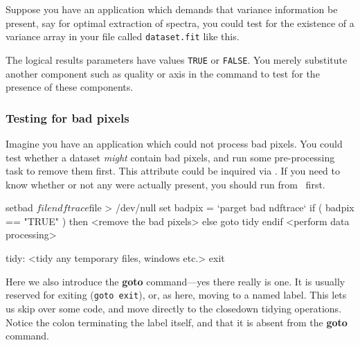 \documentclass[twoside,11pt,nolof]{starlink}
\providecommand{\KAPPAref}{\xref{{\footnotesize KAPPA}}{sun95}{}}
\begin{document}
Suppose you have an application which demands that variance information
be present, say for optimal extraction of spectra, you could test for
the existence of a variance array in your  file called \texttt{dataset.fit} like this.

\begin{small}
\end{small}
The logical results parameters have values \texttt{TRUE} or \texttt{FALSE}\@.
You merely substitute another component such as quality or axis in the
 command to test for the presence of
these components.

\subsubsection{Testing for bad pixels
\label{sc4_se_dataset_badpix}}

Imagine you have an application which could not process bad pixels.
You could test whether a dataset \emph{might\/} contain bad pixels, and
run some pre-processing task to remove them first.  This attribute
could be inquired via .  If you
need to know whether or not any were actually present, you should run
 from \KAPPAref\ first.

\begin{small}
\begin{terminalv}
     setbad $file
     ndftrace $file > /dev/null
     set badpix = `parget bad ndftrace`
     if ( badpix == "TRUE" ) then
        <remove the bad pixels>
     else
        goto tidy
     endif
     <perform data processing>

     tidy:
     <tidy any temporary files, windows etc.>
     exit
\end{terminalv}
\end{small}
Here we also introduce the \textbf{goto} command---yes there really is
one.  It is usually reserved for exiting (\texttt{goto exit}), or, as here,
moving to a named label.  This lets us skip over some code, and move
directly to the closedown tidying operations.  Notice the colon
terminating the label itself, and that it is absent from the \textbf{goto}
command.
\end{document}

